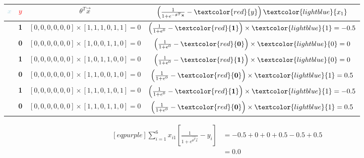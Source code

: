 \begin{table}[H]
	\centering
	\caption{}
	\label{tab:training-1}
	\begin{tabular}{*{4}{|c}|}
		\hline
		\textcolor{lightblue}{$x$} & \textcolor{red}{$y$} & $\theta^{T}\vec{x}$ & $\left( \frac{1}{1 + e^{-\vec{\theta}^{T}\vec{x}} } - \textcolor{red}{y} \right) \textcolor{lightblue}{x_{1}}$\\
		\hline
		[1, 1, 1, 0, 1, 1] & \textbf{1} & $[0, 0, 0, 0, 0, 0] \times [1, 1, 1, 0, 1, 1] = 0$ & $\left( \frac{1}{1 + e^{0}} - \textcolor{red}{\mathbf{1}} \right) \times \textcolor{lightblue}{1} = -0.5$\\
		\hline
		[1, 0, 0, 1, 1, 0] & \textbf{0} & $[0, 0, 0, 0, 0, 0] \times [1, 0, 0, 1, 1, 0] = 0$ & $\left( \frac{1}{1 + e^{0}} - \textcolor{red}{\mathbf{0}} \right) \times \textcolor{lightblue}{0} = 0$\\
		\hline
		[1, 0, 1, 1, 0, 0] & \textbf{1} & $[0, 0, 0, 0, 0, 0] \times [1, 0, 1, 1, 0, 0] = 0$ & $\left( \frac{1}{1 + e^{0}} - \textcolor{red}{\mathbf{1}} \right) \times \textcolor{lightblue}{0} = 0$\\
		\hline
		[1, 1, 0, 0, 1, 0] & \textbf{0} & $[0, 0, 0, 0, 0, 0] \times [1, 1, 0, 0, 1, 0] = 0$ & $\left( \frac{1}{1 + e^{0}} - \textcolor{red}{\mathbf{0}} \right) \times \textcolor{lightblue}{1} = 0.5$\\
		\hline
		[1, 1, 0, 1, 0, 1] & \textbf{1} & $[0, 0, 0, 0, 0, 0] \times [1, 1, 0, 1, 0, 1] = 0$ & $\left( \frac{1}{1 + e^{0}} - \textcolor{red}{\mathbf{1}} \right) \times \textcolor{lightblue}{1} = -0.5$\\
		\hline
		[1, 1, 0, 1, 1, 0] & \textbf{0} & $[0, 0, 0, 0, 0, 0] \times [1, 1, 0, 1, 1, 0] = 0$ & $\left( \frac{1}{1 + e^{0}} - \textcolor{red}{\mathbf{0}} \right) \times \textcolor{lightblue}{1} = 0.5$\\
		\hline
	\end{tabular}
\end{table}
\begin{equation*}
\begin{aligned}[eqpurple]
	\sum_{i=1}^6 x_{i1} \left[ \frac{1}{ 1 + e^{\vec{\theta^{T}}\vec{x}}} - y_{i} \right] &= -0.5 + 0 + 0 + 0.5 - 0.5 + 0.5 \\
&= 0.0
\end{aligned}
\end{equation*}
